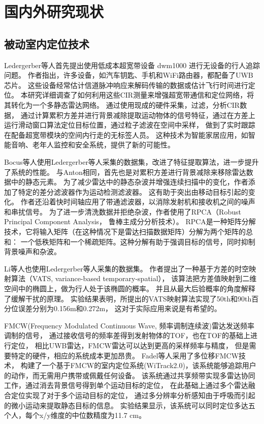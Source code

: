 \section{国内外研究现状}

\subsection{被动室内定位技术}
Ledergerber等人\cite{Ledergerber}首先提出使用低成本超宽带设备 dwm1000 进行无设备的行人追踪问题。
作者指出，许多设备，如汽车钥匙、手机和WiFi路由器，都配备了UWB芯片。
这些设备经常估计信道脉冲响应来解码传输的数据或估计飞行时间进行定位。
本研究详细调查了如何利用这些CIR测量来增强超宽带通信和定位网络，将其转化为一个多静态雷达网络。
通过使用现成的硬件采集，过滤，分析CIR数据，
通过计算累积方差并进行背景减除提取运动物体的信号特征，通过在方差上运行滑动窗口算法定位目标位置，通过粒子滤波在空间中采样，
做到了实时跟踪在配备超宽带模块的空间内行走的无标签人员。
这种技术为智能家居应用，如智能音响、老年人监控和安全系统，提供了新的可能性。

Bocus等人\cite{Bocus2021}使用Ledergerber等人采集的数据集，改进了特征提取算法，进一步提升了系统的性能。
与Anton相同，首先也是对累积方差进行背景减除来移除雷达数据中的静态元素。
为了减少雷达中的静态杂波并增强连续扫描中的变化，作者添加了特定的差分滤波器作为运动检测滤波器。
这有助于突出由移动目标引起的变化。
作者还沿着快时间轴应用了带通滤波器，以消除发射机和接收机之间的噪声和串扰信号。
为了进一步清洗数据并拒绝杂波，作者使用了RPCA（Robust Principal Component Analysis， 鲁棒主成分分析技术）。
RPCA是一种矩阵分解技术，它将输入矩阵（在这种情况下是雷达扫描数据矩阵）分解为两个矩阵的总和：
一个低秩矩阵和一个稀疏矩阵。这种分解有助于强调目标的信号，同时抑制背景噪声和杂波。

Li\cite{VATS}等人也使用Ledergerber等人采集的数据集。
作者提出了一种基于方差的时空映射算法（VATS, variance-based temporary-spatial），
该算法把方差值映射到二维空间中的椭圆上，做为行人处于该椭圆的概率。
并且从最大后验概率的角度解释了缓解干扰的原理。
实验结果表明，所提出的VATS映射算法实现了50th和90th百分位误差分别为0.156m和0.272m，
这对于实际应用来说是有希望的。

FMCW(Frequency Modulated Continuous Wave, 频率调制连续波)雷达发送频率调制的信号，
通过接收信号的频率差得到发射物体的TOF，也在TOF的基础上进行定位，
相比UWB雷达，FMCW雷达可以达到更高的采样频率与精度，
但是需要特定的硬件，相应的系统成本更加昂贵。
Fadel等人\cite{Adib_tracking,Adib2015MultiPersonLV}采用了多位移FMCW技术，
构建了一个基于FMCW的室内定位系统(WiTrack2.0)，该系统能够追踪用户的动作，而无需用户携带或佩戴任何设备。
该系统通过共享频带实现多雷达协同工作，通过消去背景信号得到单个运动目标的定位，
在此基础上通过多个雷达融合定位实现了对于多个运动目标的定位，
通过多分辨率分析感知由于呼吸而引起的微小运动来提取静态目标的信息。
实验结果显示，该系统可以同时定位多达五个人，每个x/y维度的中位数精度为11.7 cm。

